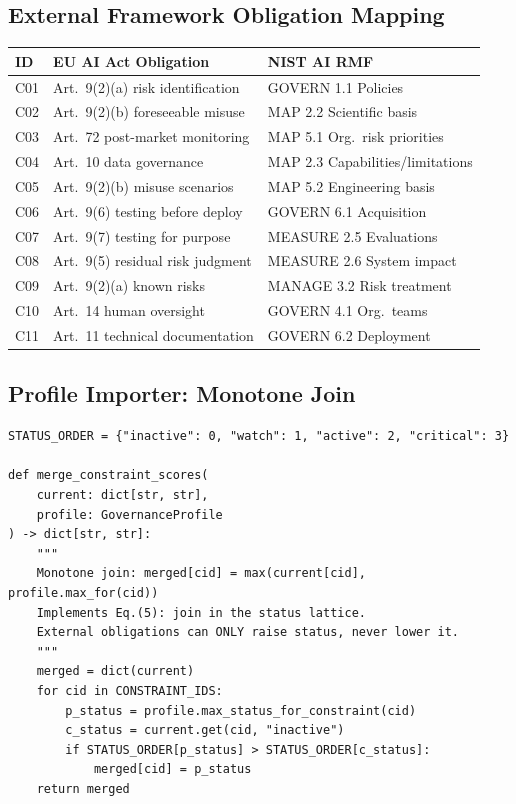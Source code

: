 \documentclass[11pt,letterpaper]{article}
\theoremstyle{remark}
\begin{document}
\subsection{External Framework Obligation Mapping}

\begin{longtable}{lp{4.5cm}p{4.5cm}}
\toprule
\textbf{ID} & \textbf{EU AI Act Obligation} & \textbf{NIST AI RMF} \\
\midrule
\endhead
C01 & Art.~9(2)(a) risk identification & GOVERN 1.1 Policies \\
C02 & Art.~9(2)(b) foreseeable misuse & MAP 2.2 Scientific basis \\
C03 & Art.~72 post-market monitoring & MAP 5.1 Org.\ risk priorities \\
C04 & Art.~10 data governance & MAP 2.3 Capabilities/limitations \\
C05 & Art.~9(2)(b) misuse scenarios & MAP 5.2 Engineering basis \\
C06 & Art.~9(6) testing before deploy & GOVERN 6.1 Acquisition \\
C07 & Art.~9(7) testing for purpose & MEASURE 2.5 Evaluations \\
C08 & Art.~9(5) residual risk judgment & MEASURE 2.6 System impact \\
C09 & Art.~9(2)(a) known risks & MANAGE 3.2 Risk treatment \\
C10 & Art.~14 human oversight & GOVERN 4.1 Org.\ teams \\
C11 & Art.~11 technical documentation & GOVERN 6.2 Deployment \\
\bottomrule
\end{longtable}

\subsection{Profile Importer: Monotone Join}

\begin{lstlisting}[style=python, caption={Lax functor implementation: monotone status join}]
STATUS_ORDER = {"inactive": 0, "watch": 1, "active": 2, "critical": 3}

def merge_constraint_scores(
    current: dict[str, str],
    profile: GovernanceProfile
) -> dict[str, str]:
    """
    Monotone join: merged[cid] = max(current[cid], profile.max_for(cid))
    Implements Eq.(5): join in the status lattice.
    External obligations can ONLY raise status, never lower it.
    """
    merged = dict(current)
    for cid in CONSTRAINT_IDS:
        p_status = profile.max_status_for_constraint(cid)
        c_status = current.get(cid, "inactive")
        if STATUS_ORDER[p_status] > STATUS_ORDER[c_status]:
            merged[cid] = p_status
    return merged
\end{lstlisting}
\end{document}
